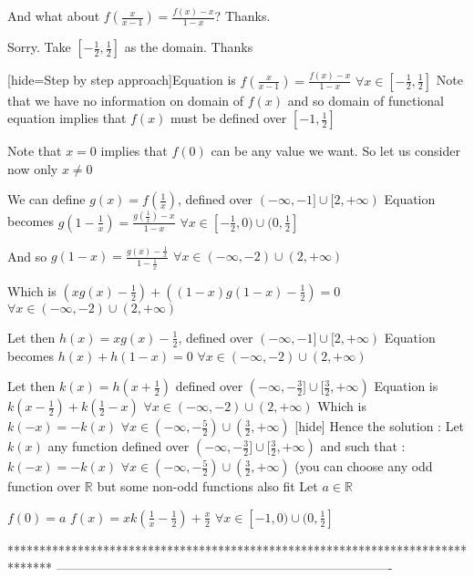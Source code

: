 \begin{solution}
	\begin{tcolorbox}And what about $f\left(\frac{x}{x-1}\right)=\frac{f(x)-x}{1-x}$? Thanks.\end{tcolorbox}

\begin{tcolorbox}Sorry. Take $\left[-\frac{1}{2},\frac{1}{2}\right]$ as the domain. Thanks\end{tcolorbox}

[hide=Step by step approach]Equation is $f(\frac x{x-1})=\frac{f(x)-x}{1-x}$ $\forall x\in[-\frac 12,\frac 12]$
Note that we have no information on domain of $f(x)$ and so domain of functional equation implies that $f(x)$ must be defined over $[-1,\frac 12]$

Note that $x=0$ implies that $f(0)$ can be any value we want.
So let us consider now only $x\ne 0$

We can define $g(x)=f(\frac 1x)$, defined over $(-\infty,-1]\cup[2,+\infty)$ 
Equation becomes $g(1-\frac 1x)=\frac{g(\frac 1x)-x}{1-x}$ $\forall x\in[-\frac 12,0)\cup(0,\frac 12]$

And so $g(1-x)=\frac{g(x)-\frac 1x}{1-\frac 1x}$ $\forall x\in(-\infty,-2)\cup(2,+\infty)$

Which is $(xg(x)-\frac 12)+((1-x)g(1-x)-\frac 12)=0$ $\forall x\in(-\infty,-2)\cup(2,+\infty)$

Let then $h(x)=xg(x)-\frac 12$, defined over $(-\infty,-1]\cup[2,+\infty)$ 
Equation becomes $h(x)+h(1-x)=0$ $\forall x\in(-\infty,-2)\cup(2,+\infty)$

Let then $k(x)=h(x+\frac 12)$ defined over $(-\infty,-\frac 32]\cup[\frac 32,+\infty)$ 
Equation is $k(x-\frac 12)+k(\frac 12-x)$ $\forall x\in(-\infty,-2)\cup(2,+\infty)$
Which is $k(-x)=-k(x)$ $\forall x\in(-\infty,-\frac 52)\cup(\frac 32,+\infty)$
[\/hide]
Hence the solution :
Let $k(x)$ any function defined over $(-\infty,-\frac 32]\cup[\frac 32,+\infty)$ and such that :
$k(-x)=-k(x)$ $\forall x\in(-\infty,-\frac 52)\cup(\frac 32,+\infty)$
(you can choose any odd function over $\mathbb R$ but some non-odd functions also fit
Let $a\in\mathbb R$

$f(0)=a$
$f(x)=xk(\frac 1x-\frac 12)+\frac x2$ $\forall x\in[-1,0)\cup(0,\frac 12]$


\end{solution}
*******************************************************************************
-------------------------------------------------------------------------------

